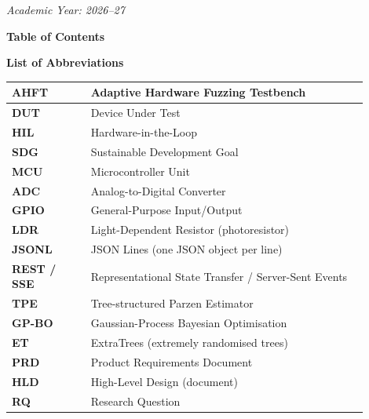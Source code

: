 \documentclass[12pt,a4paper]{article}
\begin{document}
\vspace{-0.2cm}
\begin{center}{\itshape\color{gtext}\small Academic Year: 2026--27}\end{center}

\newpage
\pagestyle{fancy}
\fancyhf{}
\fancyfoot[C]{\small\thepage}
\renewcommand{\headrulewidth}{0.8pt}
\renewcommand{\footrulewidth}{0.8pt}
\setlength{\headheight}{14.5pt}
\setcounter{tocdepth}{1}
{\centering\bfseries\fontsize{14}{17}\selectfont Table of Contents\par}
\vspace{6pt}
{\setlength{\parskip}{0pt}\renewcommand{\contentsname}{}\makeatletter{}\makeatother}
\vspace{14pt}
{\centering\bfseries\fontsize{14}{17}\selectfont List of Abbreviations\par}
\vspace{6pt}
\renewcommand{\arraystretch}{1.25}
\begin{longtable}{|>{\raggedright\arraybackslash\bfseries}p{0.20\linewidth}|>{\raggedright\arraybackslash}p{0.70\linewidth}|}
\hline
AHFT & Adaptive Hardware Fuzzing Testbench \\ \hline
DUT & Device Under Test \\ \hline
HIL & Hardware-in-the-Loop \\ \hline
SDG & Sustainable Development Goal \\ \hline
MCU & Microcontroller Unit \\ \hline
ADC & Analog-to-Digital Converter \\ \hline
GPIO & General-Purpose Input/Output \\ \hline
LDR & Light-Dependent Resistor (photoresistor) \\ \hline
JSONL & JSON Lines (one JSON object per line) \\ \hline
REST / SSE & Representational State Transfer / Server-Sent Events \\ \hline
TPE & Tree-structured Parzen Estimator \\ \hline
GP-BO & Gaussian-Process Bayesian Optimisation \\ \hline
ET & ExtraTrees (extremely randomised trees) \\ \hline
PRD & Product Requirements Document \\ \hline
HLD & High-Level Design (document) \\ \hline
RQ & Research Question \\ \hline
\end{longtable}
\newpage
{}
\setcounter{page}{1}
\end{document}
